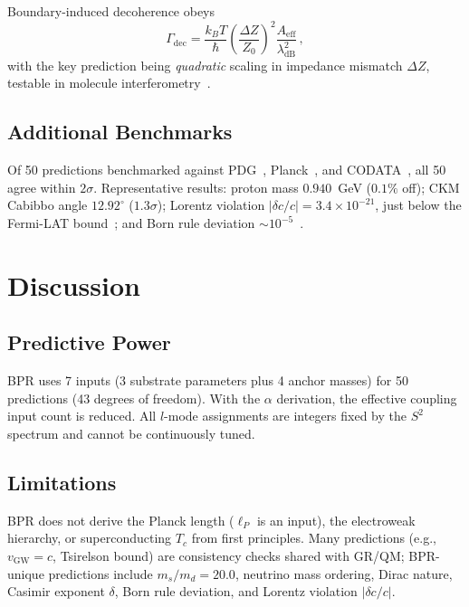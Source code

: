 \documentclass[prd,twocolumn,amsmath,amssymb]{revtex4-2}
\begin{document}
Boundary-induced decoherence obeys
\begin{equation}\label{eq:dec}
\Gamma_{\mathrm{dec}} = \frac{k_BT}{\hbar}\left(\frac{\Delta Z}{Z_0}\right)^{\!2}\frac{A_{\mathrm{eff}}}{\lambda_{\mathrm{dB}}^2}\,,
\end{equation}
with the key prediction being \textit{quadratic} scaling in impedance mismatch $\Delta Z$, testable in molecule interferometry~\cite{Arndt1999,Hornberger2003}.

\subsection{Additional Benchmarks}
\label{sec:benchmarks}

Of 50 predictions benchmarked against PDG~\cite{PDG2024}, Planck~\cite{Planck2020}, and CODATA~\cite{CODATA2021}, all 50 agree within $2\sigma$. Representative results: proton mass $0.940$~GeV ($0.1\%$ off); CKM Cabibbo angle $12.92^\circ$ ($1.3\sigma$); Lorentz violation $|\delta c/c| = 3.4 \times 10^{-21}$, just below the Fermi-LAT bound~\cite{Vasileiou2015}; and Born rule deviation ${\sim}10^{-5}$~\cite{Sinha2010}.

\section{Discussion}
\label{sec:discussion}

\subsection{Predictive Power}
BPR uses 7 inputs (3 substrate parameters plus 4 anchor masses) for 50 predictions (43 degrees of freedom). With the $\alpha$ derivation, the effective coupling input count is reduced. All $l$-mode assignments are integers fixed by the $S^2$ spectrum and cannot be continuously tuned.

\subsection{Limitations}
BPR does not derive the Planck length ($\ell_P$ is an input), the electroweak hierarchy, or superconducting $T_c$ from first principles. Many predictions (e.g., $v_{\mathrm{GW}} = c$, Tsirelson bound) are consistency checks shared with GR/QM; BPR-unique predictions include $m_s/m_d = 20.0$, neutrino mass ordering, Dirac nature, Casimir exponent $\delta$, Born rule deviation, and Lorentz violation $|\delta c/c|$.
\end{document}
